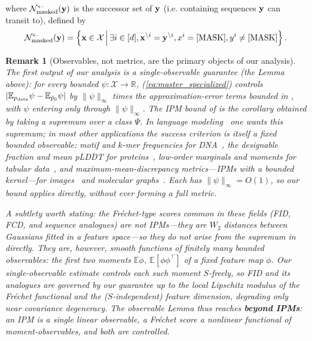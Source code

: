 \documentclass{article} %
\newtheorem{remark}[theorem]{Remark}
\def\eqref#1{equation~\ref{#1}}
\newcommand{\bfx}{{\bf x}}
\newcommand{\bfy}{ {\bf y}}
\newcommand{\mask}{\text{[MASK]}}
\renewcommand{\eqref}[1]{\textup{(\ref{#1})}}
\newcommand{\Nmasked}{\mathcal{N}^{\leftarrow}_{\text{masked}}}
\begin{document}
\myfcases
where $\Nmasked(\bfy)$ is the successor set of $\bfy$ (i.e. containing sequences $\bfy$ can transit to), defined by
\begin{equation}\label{eq:successor}
    \Nmasked(\bfy)=\left\{ \bfx \in \mathcal{X} \, \middle| \, \exists i \in [d], \bfx^{\backslash i}=\bfy^{\backslash i} , x^i=\mask, y^i \neq \mask \right\}.
    \end{equation}

\begin{remark}[Observables, not metrics, are the primary objects of our analysis]
The first output of our analysis is a single-observable guarantee (the Lemma
above): for every bounded $\psi:\mathcal X\to\mathbb R$,
\eqref{eq:master_specialized} controls
$|\mathbb E_{p_{\rm data}}\psi-\mathbb E_{\tilde p_0}\psi|$ by $\|\psi\|_\infty$
times the approximation-error terms bounded in , with $\psi$
entering only through $\|\psi\|_\infty$. The IPM bound of  is the
corollary obtained by taking a supremum over a class $\Psi$. In language
modeling~\cite{lou2024discrete} one wants this supremum; in most other
applications the success criterion is itself a fixed bounded observable: motif and
$k$-mer frequencies for DNA~\cite{schiff2025simple}, the designable fraction and
mean pLDDT for proteins~\cite{campbell2024generative}, low-order marginals and
moments for tabular data~\cite{kotelnikov2023tabddpm}, and
maximum-mean-discrepancy metrics---IPMs with a bounded kernel---for
images~\cite{campbell2022continuous} and molecular graphs~\cite{vignac2023digress}.
Each has $\|\psi\|_\infty=O(1)$, so our bound applies directly, without ever
forming a full metric. 

A subtlety worth stating: the Fr\'echet-type scores common in these fields (FID,
FCD, and sequence analogues) are not IPMs---they are $W_2$ distances between
Gaussians fitted in a feature space---so they do not arise from the supremum in
 directly. They are, however, smooth functions of finitely many
\emph{bounded} observables: the first two moments $\mathbb E\phi,\ \mathbb
E[\phi\phi^\top]$ of a fixed feature map $\phi$. Our single-observable estimate
controls each such moment $S$-freely, so FID and its analogues are governed by our
guarantee up to the local Lipschitz modulus of the Fr\'echet functional and the
($S$-independent) feature dimension, degrading only near covariance degeneracy.
The observable Lemma  thus reaches \textbf{beyond IPMs}: an IPM is a single \emph{linear}
observable, a Fr\'echet score a \emph{nonlinear} functional of moment-observables,
and both are controlled.
\end{remark}
\end{document}
